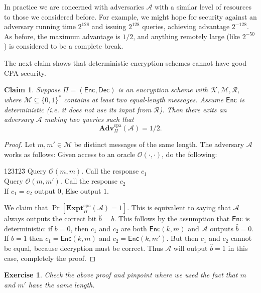 \documentclass[11pt]{article}
\newtheorem{exercise}{Exercise}
\newtheorem{claim}{Claim}
\newcommand{\msgs}{\mathcal{M}}
\newcommand{\keys}{\mathcal{K}}
\newcommand{\rands}{\mathcal{R}}
\newcommand{\Enc}{\mathsf{Enc}}
\newcommand{\Dec}{\mathsf{Dec}}
\newcommand{\calA}{\mathcal{A}}
\newcommand{\calO}{\mathcal{O}}
\newcommand{\Adv}{\mathbf{Adv}}
\newcommand{\AdvCPA}[2]{\Adv^{\mathrm{cpa}}_{#1}({#2})}
\newcommand{\bits}{\{0,1\}}
\newcommand{\hatb}{\hat{b}}
\newcommand{\ExptCPA}{\mathbf{Expt}^{\mathrm{cpa}}}
\begin{document}
In practice we are concerned with adversaries $\calA$ with a similar level of
resources to those we considered before. For example, we might hope for
security against an adversary running time $2^{128}$ and issuing $2^{128}$
queries, achieving advantage $2^{-128}$. As before, the maximum advantage
is $1/2$, and anything remotely large (like $2^{-50}$) is considered to be
a complete break.

\bigskip

The next claim shows that deterministic encryption schemes cannot have
good CPA security.
\begin{claim}
    Suppose $\Pi=(\Enc,\Dec)$ is an encryption scheme with
    $\keys,\msgs,\rands$, where $\msgs\subseteq\bits^*$ contains at least two 
    equal-length messages. Assume
    $\Enc$ is deterministic (i.e. it does not use its input from $\rands$).
    Then there exits an adversary $\calA$ making two queries such that
    \[
        \AdvCPA{\Pi}{\calA} = 1/2.
    \]
\end{claim}
\begin{proof}
    Let $m,m'\in\msgs$ be distinct messages of the same length. The adversary
    $\calA$ works as follows: Given access to an oracle $\calO(\cdot,\cdot)$,
    do the following:

        \begin{tabbing}
            123\=123\=\kill
            \> Query $\calO(m,m)$. Call the response $c_1$\\
            \> Query $\calO(m,m')$. Call the response $c_2$\\
            \> If $c_1 = c_2$ output $0$, Else output $1$.
        \end{tabbing}

    We claim that $\Pr[\ExptCPA_\Pi(\calA) = 1]$. This is equivalent
    to saying that $\calA$ always outputs the correct bit $\hatb=b$.
    This follows by the assumption that $\Enc$ is deterministic:
    if $b=0$, then $c_1$ and $c_2$ are both $\Enc(k,m)$ and $\calA$
    outputs $\hatb=0$. If $b=1$ then $c_1 =\Enc(k,m)$ and $c_2 =\Enc(k,m')$.
    But then $c_1$ and $c_2$ cannot be equal, because decryption
    must be correct. Thus $\calA$ will output $\hatb=1$ in this case,
    completely the proof.
\end{proof}

\begin{exercise}
    Check the above proof and pinpoint where we used the fact that
    $m$ and $m'$ have the same length.
\end{exercise}
\end{document}
